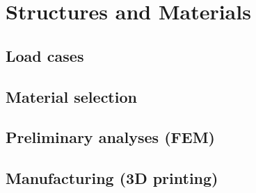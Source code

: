 \chapter{Structures and Materials}
\label{ch:structures_materials}
\section{Load cases}

\section{Material selection}

\section{Preliminary analyses (FEM)}

\section{Manufacturing (3D printing)}
